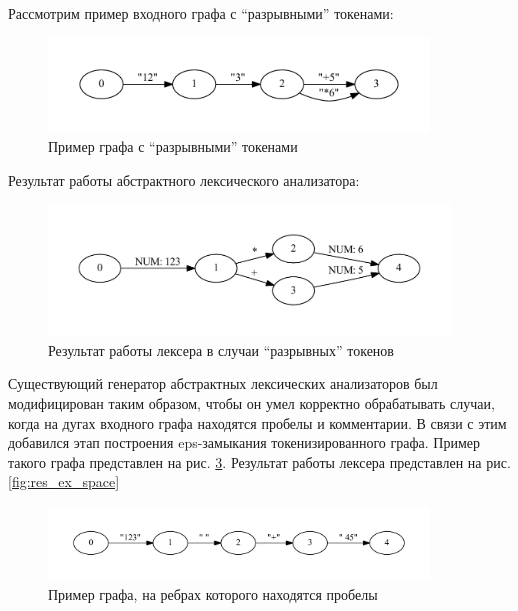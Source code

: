 \documentclass{matmex-diploma}
\begin{document}
\begin{enumerate}
Рассмотрим пример входного графа с “разрывными” токенами:

\begin{figure}[h!]
\begin{center}
\includegraphics[width=0.9\textwidth]{example_calc_break}
\caption{Пример графа с “разрывными” токенами }
\label{fig:example_calc_break} 
\end{center}
\end{figure}

\newpage
Результат работы абстрактного лексического анализатора:

\begin{figure}[h!]
\begin{center}
\includegraphics[width=0.95\textwidth]{res_ex_calc_break}
\caption{Результат работы лексера в случаи “разрывных” токенов }
\label{fig:res_ex_calc_break} 
\end{center}
\end{figure}

Существующий генератор абстрактных лексических анализаторов был модифицирован таким образом, чтобы он умел корректно обрабатывать случаи, 
когда на дугах входного графа находятся пробелы и комментарии. В связи с этим добавился этап построения eps-замыкания токенизированного графа.
Пример такого графа представлен на рис. \ref{fig:example_space}. Результат работы лексера представлен на рис.\ref{fig:res_ex_space}

\begin{figure}[h!]
\begin{center}
\includegraphics[width=0.9\textwidth]{example_space}
\caption{Пример графа, на ребрах которого находятся пробелы}
\label{fig:example_space} 
\end{center}
\end{figure}


\end{enumerate}
\end{document}
